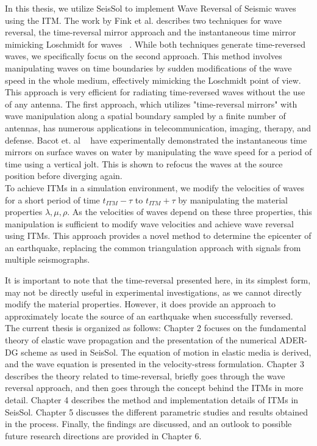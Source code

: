 In this thesis, we utilize SeisSol to implement Wave Reversal of Seismic waves using the \ac{ITM}. 
The work by Fink et al. describes two techniques for wave reversal, the time-reversal mirror approach and the instantaneous time mirror mimicking Loschmidt for waves ~\parencite{Fink2017}. 
While both techniques generate time-reversed waves, we specifically focus on the second approach. 
This method involves manipulating waves on time boundaries by sudden modifications of the wave speed in the whole medium, effectively mimicking the Loschmidt point of view. 
This approach is very efficient for radiating time-reversed waves without the use of any antenna. 
The first approach, which utilizes "time-reversal mirrors" with wave manipulation along a spatial boundary sampled by a finite number of antennas, has numerous applications in telecommunication, imaging, therapy, and defense.
Bacot et. al ~\parencite{Bacot2016} have experimentally demonstrated the instantaneous time mirrors on surface waves on water by manipulating the wave speed for a period of time using a vertical jolt.
This is shown to refocus the waves at the source position before diverging again.\\

To achieve \ac{ITM}s in a simulation environment, we modify the velocities of waves for a short period of time $t_{ITM} - \tau$ to $t_{ITM} + \tau$ by manipulating 
the material properties $\lambda, \mu, \rho$. As the velocities of waves depend on these three properties, this manipulation is 
sufficient to modify wave velocities and achieve wave reversal using \ac{ITM}s. This approach provides a novel method to determine 
the epicenter of an earthquake, replacing the common triangulation approach with signals from multiple seismographs.

It is important to note that the time-reversal presented here, in its simplest form, may not be directly useful in experimental 
investigations, as we cannot directly modify the material properties. However, it does provide an approach to approximately 
locate the source of an earthquake when successfully reversed. \\

The current thesis is organized as follows: Chapter 2 focuses on the fundamental theory of elastic wave propagation and the presentation
of the numerical \ac{ADER}-\ac{DG} scheme as used in SeisSol. The equation of motion in elastic media is derived, and the wave equation is presented
in the velocity-stress formulation. Chapter 3 describes the theory related to time-reversal, briefly goes through the wave reversal approach,
and then goes through the concept behind the \ac{ITM}s in more detail. Chapter 4 describes the method and implementation details of \ac{ITM}s
in SeisSol. Chapter 5 discusses the different parametric studies and results obtained in the process. Finally, the findings are discussed,
and an outlook to possible future research directions are provided in Chapter 6. 

